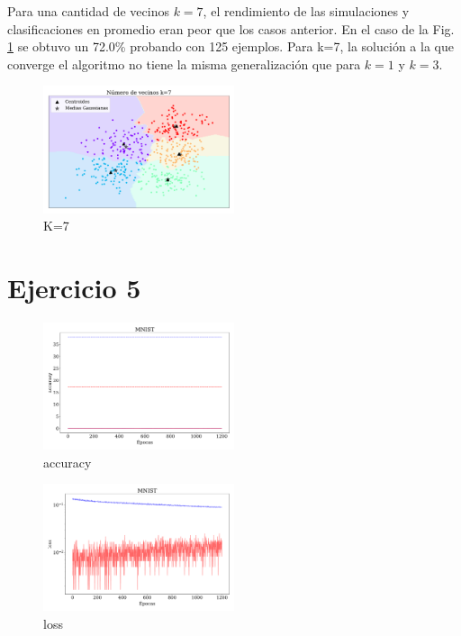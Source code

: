     Para una cantidad de vecinos $k=7$, el rendimiento de las  simulaciones y clasificaciones en promedio eran peor que los casos anterior. En el caso de la Fig.\,\ref{fig:ejer4_k_7} se obtuvo un 72.0\% probando con 125 ejemplos. Para k=7, la solución a la que converge el algoritmo no tiene la misma generalización que para $k=1$ y $k=3$.


\begin{figure}[H]
    \centering
    \includegraphics[width=0.5\textwidth]{plots/ejer_4_K-7_si_converge.pdf}
    \caption{K=7 }
    \label{fig:ejer4_k_7}
\end{figure} 
    

\section*{Ejercicio 5}

\begin{figure}[H]
    \centering
    \includegraphics[width=0.5\textwidth]{plots/ejer_5_MNIST_acc.pdf}
    \caption{accuracy}
    \label{fig:ejer5_mnist_acc}
\end{figure} 

\begin{figure}[H]
    \centering
    \includegraphics[width=0.5\textwidth]{plots/ejer_5_MNIST_los.pdf}
    \caption{loss}
    \label{fig:ejer5_mnist_loss}
\end{figure} 




